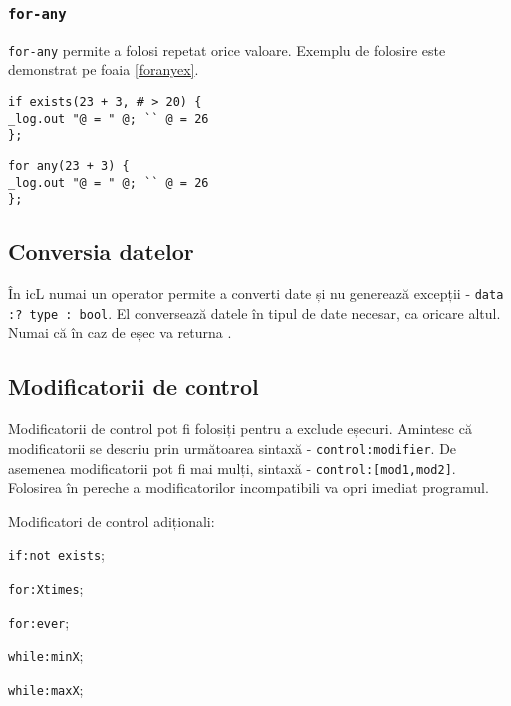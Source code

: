 \subsubsection{\texttt{for-any}}

\texttt{for-any} permite a folosi repetat orice valoare. Exemplu de folosire este demonstrat pe foaia \ref{foranyex}.

\begin{sourcecode}
\label{ifexistsex}
\begin{verbatim}
if exists(23 + 3, # > 20) {
_log.out "@ = " @; `` @ = 26
};
\end{verbatim}
\end{sourcecode}

\begin{sourcecode}
\label{foranyex}
\begin{verbatim}
for any(23 + 3) {
_log.out "@ = " @; `` @ = 26
};
\end{verbatim}
\end{sourcecode}


\subsection{Conversia datelor}

În icL numai un operator permite a converti date și nu generează excepții - \texttt{data :? type : bool}.
El conversează datele în tipul de date necesar, ca oricare altul. Numai că în caz de eșec va returna \void.

\subsection{Modificatorii de control}

Modificatorii de control pot fi folosiți pentru a exclude eșecuri.
Amintesc că modificatorii se descriu prin următoarea sintaxă - \texttt{control:modifier}. De asemenea modificatorii pot fi mai mulți, sintaxă - \texttt{control:[mod1,mod2]}. Folosirea în pereche a modificatorilor incompatibili va opri imediat programul.

Modificatori de control adiționali:
\begin{icItems}
	\item \texttt{if:not exists};
	\item \texttt{for:Xtimes};
	\item \texttt{for:ever};
	\item \texttt{while:minX};
	\item \texttt{while:maxX};
\end{icItems}

